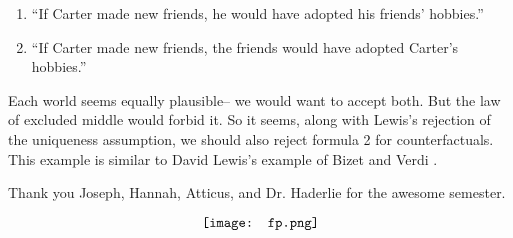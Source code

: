 \documentclass{article}
\newcommand*\fancypants{\vcenter{\hbox{\texttt{[image: fp.png]}}}}
\begin{document}
    \begin{enumerate}
        \item ``If Carter made new friends, he would have adopted his friends' hobbies.''
        \item ``If Carter made new friends, the friends would have adopted Carter's hobbies.''
    \end{enumerate}

    Each world seems equally plausible-- we would want to accept both. But the law of excluded middle would forbid it. 
    So it seems, along with Lewis's rejection of the uniqueness assumption, we should also reject formula 2 for counterfactuals.
    This example is similar to David Lewis's example of Bizet and Verdi \cite{lewis}.

    \begin{center}
        Thank you Joseph, Hannah, Atticus, and Dr. Haderlie for the awesome semester.

        $$\fancypants$$
    \end{center}
    \newpage
    
    \nocite{*}
    

    
\end{document}
